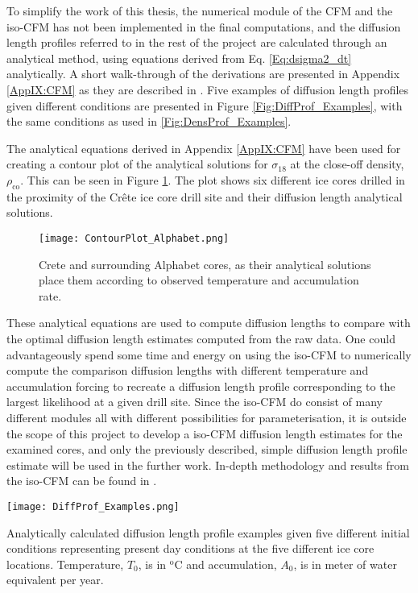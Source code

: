 \documentclass[../../CompleteThesis2/Complete_2ndDraft]{subfiles}
\begin{document}
To simplify the work of this thesis, the numerical module of the CFM and the iso-CFM has not been implemented in the final computations, and the diffusion length profiles referred to in the rest of the project are calculated through an analytical method, using equations derived from Eq. \ref{Eq:dsigma2_dt} analytically. A short walk-through of the derivations are presented in Appendix \ref{AppIX:CFM} as they are described in \cite[Gkinis et al., 2021]{Gkinis2021}. Five examples of diffusion length profiles given different conditions are presented in Figure \ref{Fig:DiffProf_Examples}, with the same conditions as used in \ref{Fig:DensProf_Examples}.

The analytical equations derived in Appendix \ref{AppIX:CFM} have been used for creating a contour plot of the analytical solutions for $\sigma_{18}$ at the close-off density, $\rho_{\text{co}}$. This can be seen in Figure \ref{Fig:ICE_ContourPlot}. The plot shows six different ice cores drilled in the proximity of the Crête ice core drill site and their diffusion length analytical solutions.

\begin{figure}
	\centering
	\texttt{[image: ContourPlot\_Alphabet.png]}
	\caption{Crete and surrounding Alphabet cores, as their analytical solutions place them according to observed temperature and accumulation rate.}
	\label{Fig:ICE_ContourPlot}
\end{figure}


These analytical equations are used to compute diffusion lengths to compare with the optimal diffusion length estimates computed from the raw data. One could advantageously spend some time and energy on using the iso-CFM to numerically compute the comparison diffusion lengths with different temperature and accumulation forcing to recreate a diffusion length profile corresponding to the largest likelihood at a given drill site. Since the iso-CFM do consist of many different modules all with different possibilities for parameterisation, it is outside the scope of this project to develop a iso-CFM diffusion length estimates for the examined cores, and only the previously described, simple diffusion length profile estimate will be used in the further work. In-depth methodology and results from the iso-CFM can be found in \cite[Gkinis et al., 2021]{Gkinis2021}.

\begin{marginfigure}
	\centering
	\texttt{[image: DiffProf\_Examples.png]}
	\caption{Analytically calculated diffusion length profile examples given five different initial conditions representing present day conditions at the five different ice core locations. Temperature, $T_0$, is in $^{\text{o}}$C and accumulation, $A_0$, is in meter of water equivalent per year.}
	\label{Fig:DiffProf_Examples}
\end{marginfigure}
\end{document}
